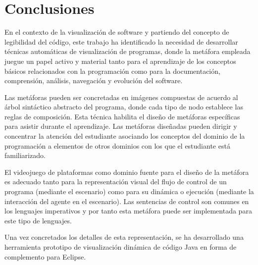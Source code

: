 \documentclass{llncs}
\begin{document}


\section{Conclusiones}
\label{sec:conclusions}

En el contexto de la visualización de software y partiendo del concepto de legibilidad del código, este trabajo ha identificado la necesidad de desarrollar técnicas automáticas de visualización de programas, donde la metáfora empleada juegue un papel activo y material tanto para el aprendizaje de los conceptos básicos relacionados con la programación como para la documentación, comprensión, análisis, navegación y evolución del software.

Las metáforas pueden ser concretadas en imágenes compuestas de acuerdo al árbol sintáctico abstracto del programa, donde cada tipo de nodo establece las reglas de composición. Esta técnica habilita el diseño de metáforas específicas para asistir durante el aprendizaje. Las metáforas diseñadas pueden dirigir y concentrar la atención del estudiante asociando los conceptos del dominio de la programación a elementos de otros dominios con los que el estudiante está familiarizado. 

El videojuego de plataformas como dominio fuente para el diseño de la metáfora es adecuado tanto para la representación visual del flujo de control de un programa (mediante el escenario) como para su dinámica o ejecución (mediante la interacción del agente en el escenario). Las sentencias de control son comunes en los lenguajes imperativos y por tanto esta metáfora puede ser implementada para este tipo de lenguajes. 

Una vez concretados los detalles de esta representación, se ha desarrollado una herramienta prototipo de visualización dinámica de código Java en forma de complemento para Eclipse. 
\end{document}
